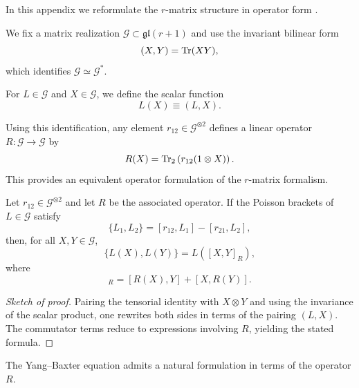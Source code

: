 In this appendix we reformulate the $r$-matrix structure in operator form \cite{SemenovTyanShanskii1983,babelon2003introduction}.

We fix a matrix realization $\mathcal G \subset \mathfrak{gl}(r+1)$ and use the invariant bilinear form
\begin{equation}
    (X,Y)=\Tr(XY),
\end{equation}
which identifies $\mathcal{G} \simeq \mathcal{G}^*$.

\begin{definition}
    For $L \in \mathcal{G}$ and $X \in \mathcal{G}$, we define the scalar function
    \begin{equation}
        L(X) \equiv (L,X).
    \end{equation}
\end{definition}

Using this identification, any element $r_{12} \in \mathcal{G}^{\otimes 2}$ defines a linear operator
$R:\mathcal{G} \to \mathcal{G}$ by
\begin{equation}
    R(X)=\Tr_2\left(r_{12}(1 \otimes X)\right).
\end{equation}
This provides an equivalent operator formulation of the $r$-matrix formalism.

\begin{proposition}
    Let $r_{12} \in \mathcal{G}^{\otimes 2}$ and let $R$ be the associated operator.  
    If the Poisson brackets of $L \in \mathcal{G}$ satisfy
    \begin{equation}
        \{L_1,L_2\} = [r_{12},L_1] - [r_{21},L_2],
    \end{equation}
    then, for all $X,Y \in \mathcal{G}$,
    \begin{equation}
        \{L(X),L(Y)\} = L([X,Y]_R),
    \end{equation}
    where
    \begin{equation}
        [X,Y]_R = [R(X),Y] + [X,R(Y)].
    \end{equation}
\end{proposition}

\begin{proof}[Sketch of proof]
    Pairing the tensorial identity with $X \otimes Y$ and using the invariance of the scalar product,
    one rewrites both sides in terms of the pairing $(L,X)$. The commutator terms reduce to expressions involving $R$, yielding the stated formula.
\end{proof}

The Yang--Baxter equation admits a natural formulation in terms of the operator $R$.

